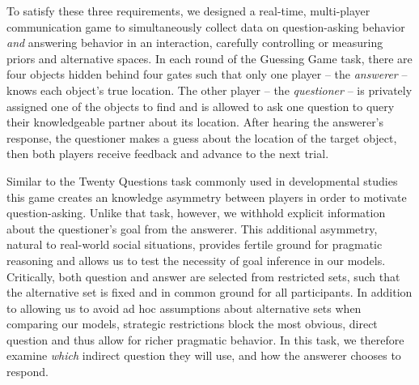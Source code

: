 \documentclass[12pt, floatsintext, jou]{apa6}
\begin{document}
To satisfy these three requirements, we designed a real-time, multi-player communication game to simultaneously collect data on question-asking behavior \emph{and} answering behavior in an interaction, carefully controlling or measuring priors and alternative spaces. In each round of the Guessing Game task, there are four objects hidden behind four gates such that only one player -- the \emph{answerer} -- knows each object's true location. The other player -- the \emph{questioner} -- is privately assigned one of the objects to find and is allowed to ask one question to query their knowledgeable partner about its location. After hearing the answerer's response, the questioner makes a guess about the location of the target object, then both players receive feedback and advance to the next trial. 

Similar to the Twenty Questions task commonly used in developmental studies \cite{Siegler77_TwentyQuestions, NelsonDivjak___Meder14_GuessWho, RuggeriEtAl15_HierarchicalTwentyQs} this game creates an knowledge asymmetry between players in order to motivate question-asking. Unlike that task, however, we withhold explicit information about the questioner's goal from the answerer. This additional asymmetry, natural to real-world social situations, provides fertile ground for pragmatic reasoning and allows us to test the necessity of goal inference in our models. Critically, both question and answer are selected from restricted sets, such that the alternative set is fixed and in common ground for all participants. In addition to allowing us to avoid ad hoc assumptions about alternative sets when comparing our models, strategic restrictions block the most obvious, direct question and thus allow for richer pragmatic behavior. In this task, we therefore examine \emph{which} indirect question they will use, and how the answerer chooses to respond. 
\end{document}

